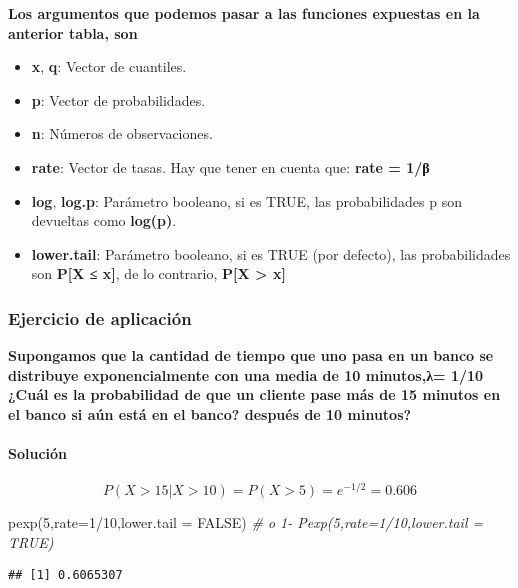 \documentclass[
]{article}
\newenvironment{Shaded}{\begin{snugshade}}{\end{snugshade}}
\newcommand{\AttributeTok}[1]{\textcolor[rgb]{0.77,0.63,0.00}{#1}}
\newcommand{\CommentTok}[1]{\textcolor[rgb]{0.56,0.35,0.01}{\textit{#1}}}
\newcommand{\ConstantTok}[1]{\textcolor[rgb]{0.00,0.00,0.00}{#1}}
\newcommand{\DecValTok}[1]{\textcolor[rgb]{0.00,0.00,0.81}{#1}}
\newcommand{\FunctionTok}[1]{\textcolor[rgb]{0.00,0.00,0.00}{#1}}
\newcommand{\NormalTok}[1]{#1}
\newcommand{\SpecialCharTok}[1]{\textcolor[rgb]{0.00,0.00,0.00}{#1}}
\begin{document}
\textbf{Los argumentos que podemos pasar a las funciones expuestas en la
anterior tabla, son}

\begin{itemize}
\item
  \textbf{x}, \textbf{q}: Vector de cuantiles.
\item
  \textbf{p}: Vector de probabilidades.
\item
  \textbf{n}: Números de observaciones.
\item
  \textbf{rate}: Vector de tasas. Hay que tener en cuenta que:
  \textbf{rate = 1/β}
\item
  \textbf{log}, \textbf{log.p}: Parámetro booleano, si es TRUE, las
  probabilidades p son devueltas como \textbf{log(p)}.
\item
  \textbf{lower.tail}: Parámetro booleano, si es TRUE (por defecto), las
  probabilidades son \textbf{P{[}X ≤ x{]}}, de lo contrario,
  \textbf{P{[}X \textgreater{} x{]}}
\end{itemize}

\hypertarget{ejercicio-de-aplicaciuxf3n-2}{%
\subsubsection{Ejercicio de
aplicación}\label{ejercicio-de-aplicaciuxf3n-2}}

\textbf{Supongamos que la cantidad de tiempo que uno pasa en un banco se
distribuye exponencialmente con una media de 10 minutos,λ= 1/10 ¿Cuál es
la probabilidad de que un cliente pase más de 15 minutos en el banco si
aún está en el banco? después de 10 minutos?}

\hypertarget{soluciuxf3n-3}{%
\paragraph{Solución}\label{soluciuxf3n-3}}

\[P(X>15|X>10)=P(X>5)=e^{-1/2} = 0.606\]

\begin{Shaded}
\begin{Highlighting}[]
\FunctionTok{pexp}\NormalTok{(}\DecValTok{5}\NormalTok{,}\AttributeTok{rate=}\DecValTok{1}\SpecialCharTok{/}\DecValTok{10}\NormalTok{,}\AttributeTok{lower.tail =} \ConstantTok{FALSE}\NormalTok{) }\CommentTok{\# o 1{-} Pexp(5,rate=1/10,lower.tail = TRUE)}
\end{Highlighting}
\end{Shaded}

\begin{verbatim}
## [1] 0.6065307
\end{verbatim}
\end{document}
